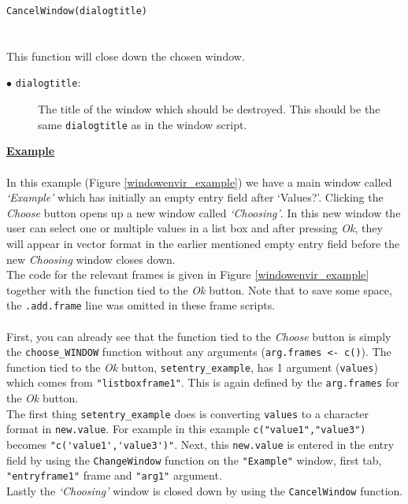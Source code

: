 \documentclass[a4paper]{article}\usepackage[]{graphicx}\usepackage[]{color}
\begin{document}
\noindent \verb|CancelWindow(dialogtitle)|
\\ \\
\\
This function will close down the chosen window.
\begin{description}
  \item[$\bullet$ \texttt{dialogtitle}:] The title of the window which should be
  destroyed. This should be the same \verb|dialogtitle| as in the window script.
   
\end{description}
{\bf \underline{Example}}
\\ \\
\noindent In this example (Figure \ref{windowenvir_example}) we have a main window called {\it `Example'} which
has initially an empty entry field after `Values?'. Clicking the {\it Choose}
button opens up a new window called {\it `Choosing'}. In this new window the
user can select one or multiple values in a list box and after pressing {\it
Ok}, they will appear in vector format in the earlier mentioned empty entry
field before the new {\it Choosing} window closes down.\\
The code for the relevant frames is given in Figure \ref{windowenvir_example}
together with the function tied to the {\it Ok} button. Note that to save some
space, the \verb|.add.frame| line was omitted in these frame scripts.
\\ \\
First, you can already see that the function tied to the {\it Choose} button is
simply the \verb|choose_WINDOW| function without any arguments (\verb|arg.frames <- c()|). 
The function tied to the {\it Ok} button, \verb|setentry_example|, has 1
argument (\verb|values|) which comes from \verb|"listboxframe1"|. This is again
defined by the \verb|arg.frames| for the {\it Ok} button. \\
The first thing \verb|setentry_example| does is converting \verb|values| to a
character format in \verb|new.value|. For example in this example
\verb|c("value1","value3")| becomes \verb|"c('value1','value3')"|. Next, this
\verb|new.value| is entered in the entry field by using the \verb|ChangeWindow|
function on the \verb|"Example"| window, first tab, \verb|"entryframe1"|
frame and \verb|"arg1"| argument.\\
Lastly the {\it `Choosing'} window is closed down by using the
\verb|CancelWindow| function.
\end{document}
